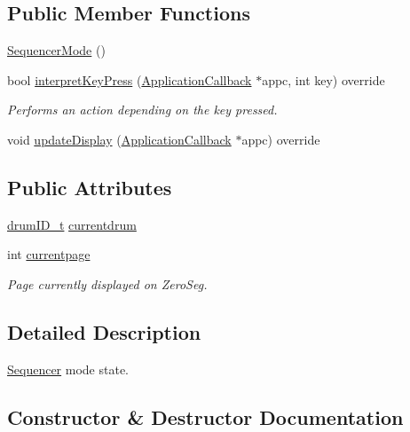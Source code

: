 \subsection*{Public Member Functions}
\begin{DoxyCompactItemize}
\item 
\hyperlink{classdrumpi_1_1SequencerMode_ae227bba77d671b927514be2cf3fbb0a0}{Sequencer\+Mode} ()
\item 
bool \hyperlink{classdrumpi_1_1SequencerMode_aaa5dea1ffd66792ba62afae00820ffc6}{interpret\+Key\+Press} (\hyperlink{classdrumpi_1_1ApplicationCallback}{Application\+Callback} $\ast$appc, int key) override
\begin{DoxyCompactList}\small\item\em Performs an action depending on the key pressed. \end{DoxyCompactList}\item 
void \hyperlink{classdrumpi_1_1SequencerMode_a0308bc9641daff4f48d74f9d2493d123}{update\+Display} (\hyperlink{classdrumpi_1_1ApplicationCallback}{Application\+Callback} $\ast$appc) override
\end{DoxyCompactItemize}
\subsection*{Public Attributes}
\begin{DoxyCompactItemize}
\item 
\hyperlink{namespacedrumpi_a3897274035c1b939a604438abe648b1b}{drum\+I\+D\+\_\+t} \hyperlink{classdrumpi_1_1SequencerMode_abc62b03ade3fc568d419584756974aa1}{currentdrum}
\item 
int \hyperlink{classdrumpi_1_1SequencerMode_a3c1fc81b3a46f7df19e1bfa87b7f9bb2}{currentpage}
\begin{DoxyCompactList}\small\item\em Page currently displayed on Zero\+Seg. \end{DoxyCompactList}\end{DoxyCompactItemize}


\subsection{Detailed Description}
\hyperlink{classdrumpi_1_1Sequencer}{Sequencer} mode state. 

\subsection{Constructor \& Destructor Documentation}
\mbox{\label{classdrumpi_1_1SequencerMode_ae227bba77d671b927514be2cf3fbb0a0}} 
